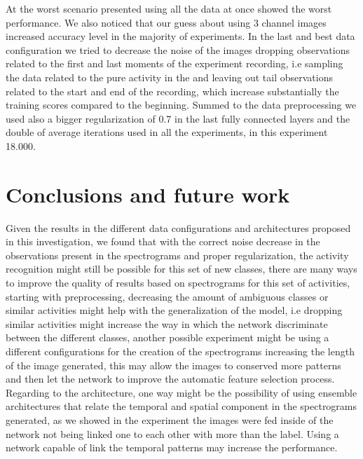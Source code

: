 \documentclass[10pt,halfline,a4paper]{ouparticle}
\begin{document}
\noindent
At the worst scenario presented using all the data at once showed the worst performance. We also noticed that our guess about using 3 channel images increased accuracy level in the majority of  experiments. In the last and best data configuration we tried to decrease the noise of the images dropping observations related to the first and last moments of the experiment recording, i.e sampling the data related to the pure activity in the and leaving out tail observations related to the start and end of the recording, which increase substantially the training scores compared to the beginning. Summed to the data preprocessing we used also a bigger regularization of 0.7 in the last fully connected layers and the double of average iterations used in all the experiments, in this experiment 18.000.  \\

\section{Conclusions and future work}
\noindent
Given the results in the different data configurations and architectures proposed in this investigation, we found that with the correct noise decrease in the observations present in the spectrograms and proper regularization, the activity recognition might still be possible for this set of new classes, there are many ways to improve the quality of results based on spectrograms for this set of activities, starting with preprocessing, decreasing the amount of ambiguous classes or similar activities might help with the generalization of the model, i.e dropping similar activities might increase the way in which the network discriminate between the different classes, another possible experiment might be using a different configurations for the creation of the spectrograms increasing the length of the image generated, this may allow the images to conserved more patterns and then let the network to improve the automatic feature selection process. \\

\noindent
Regarding to the architecture, one way might be the possibility of using ensemble architectures that relate the temporal and spatial component in the spectrograms generated, as we showed in the experiment the images were fed inside of the network not being linked one to each other with more than the label. Using a network capable of link the temporal patterns may increase the performance. \\
\end{document}
